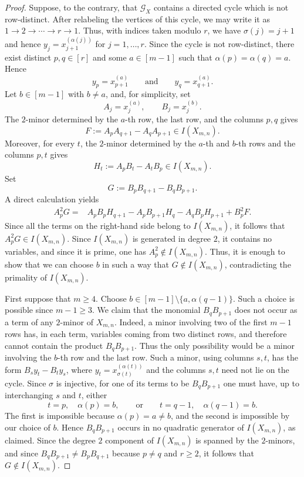 \documentclass[12pt]{amsart}
\numberwithin{equation}{section}
\begin{document}
\begin{proof}
Suppose, to the contrary, that $\mathcal{G}_X$ contains a directed
cycle which is not row-distinct. After relabeling the vertices of this
cycle, we may write it as $1\longrightarrow 2\longrightarrow\cdots\longrightarrow r
\longrightarrow 1.$ Thus, with indices taken modulo $r$, we have $\sigma(j)=j+1$ and hence $y_j=x_{j+1}^{(\alpha(j))}$ for $j=1,\ldots,r$. Since the cycle is not row-distinct, there exist distinct
$p,q\in[r]$ and some $a\in[m-1]$ such that $\alpha(p)=\alpha(q)=a.$ Hence
\[
y_p=x_{p+1}^{(a)}
\qquad\text{and}\qquad
y_q=x_{q+1}^{(a)}.
\]
Let $b\in[m-1]$ with $b\neq a$, and, for simplicity, set
\[
A_j=x_j^{(a)},
\qquad
B_j=x_j^{(b)}.
\]
The $2$-minor determined by the $a$-th row, the last row, and the
columns $p,q$ gives
\[
F:=A_pA_{q+1}-A_qA_{p+1}\in I(X_{m,n}).
\]
Moreover, for every $t$, the $2$-minor determined by the $a$-th and
$b$-th rows and the columns $p,t$ gives
\[
H_t:=A_pB_t-A_tB_p\in I(X_{m,n}).
\]
Set
\[
G:=B_pB_{q+1}-B_qB_{p+1}.
\]
A direct calculation yields
\[
\begin{aligned}
A_p^2G
={}&
A_pB_pH_{q+1}
-A_pB_{p+1}H_q
-A_qB_pH_{p+1}+B_p^2F.
\end{aligned}
\]
Since all the terms on the right-hand side belong to $I(X_{m,n})$, it follows that $A_p^2 G
\in I(X_{m,n}).$ Since $I(X_{m,n})$ is generated in degree $2$, it contains no variables, and since it is prime, one has $A_p^2\notin I(X_{m,n})$. Thus, it is enough to show that we can choose $b$ in such a way that $G\notin I(X_{m,n})$, contradicting the primality of $I(X_{m,n})$.

First suppose that $m\geq4$. Choose $b\in[m-1]\setminus\{a,\alpha(q-1)\}.$ Such a choice is possible since $m-1\geq3$. We claim that the monomial $B_qB_{p+1}$ does not occur as a term of any $2$-minor of $X_{m,n}$. Indeed, a minor involving two of the first $m-1$ rows has, in each term, variables coming from two distinct rows, and therefore cannot contain the product $B_qB_{p+1}$. Thus the only possibility would be a minor involving the $b$-th row and the last row. Such a minor, using columns $s,t$, has the form
$B_s y_t-B_t y_s$, where
$y_t=x_{\sigma(t)}^{(\alpha(t))}$ and the columns
$s,t$ need not lie on the cycle.
Since $\sigma$ is injective, for one of its terms
to be $B_qB_{p+1}$ one must have, up to
interchanging $s$ and $t$, either
\[
t=p,\quad \alpha(p)=b,
\qquad\text{or}\qquad
t=q-1,\quad \alpha(q-1)=b.
\]
 The first is impossible because $\alpha(p)=a\neq b$, and the second is impossible by our choice of $b$. Hence $B_qB_{p+1}$ occurs in no quadratic generator of $I(X_{m,n})$, as claimed. 
Since the degree $2$ component of $I(X_{m,n})$ is
spanned by the $2$-minors, and since
$B_qB_{p+1}\neq B_pB_{q+1}$ because $p\neq q$
and $r\geq 2$, it follows that
$G\notin I(X_{m,n})$.




\end{proof}
\end{document}
